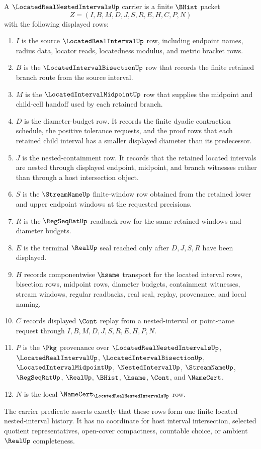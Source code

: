 \begin{definition}
\label{def:located-real-nested-intervals-carrier}
A $\LocatedRealNestedIntervalsUp$ carrier is a finite $\BHist$ packet
$$
Z=(I,B,M,D,J,S,R,E,H,C,P,N)
$$
with the following displayed rows:
\begin{enumerate}
\item $I$ is the source $\LocatedRealIntervalUp$ row, including endpoint names, radius data, locator reads, locatedness modulus, and metric bracket rows.
\item $B$ is the $\LocatedIntervalBisectionUp$ row that records the finite retained branch route from the source interval.
\item $M$ is the $\LocatedIntervalMidpointUp$ row that supplies the midpoint and child-cell handoff used by each retained branch.
\item $D$ is the diameter-budget row. It records the finite dyadic contraction schedule, the positive tolerance requests, and the proof rows that each retained child interval has a smaller displayed diameter than its predecessor.
\item $J$ is the nested-containment row. It records that the retained located intervals are nested through displayed endpoint, midpoint, and branch witnesses rather than through a host intersection object.
\item $S$ is the $\StreamNameUp$ finite-window row obtained from the retained lower and upper endpoint windows at the requested precisions.
\item $R$ is the $\RegSeqRatUp$ readback row for the same retained windows and diameter budgets.
\item $E$ is the terminal $\RealUp$ seal reached only after $D,J,S,R$ have been displayed.
\item $H$ records componentwise $\hsame$ transport for the located interval rows, bisection rows, midpoint rows, diameter budgets, containment witnesses, stream windows, regular readbacks, real seal, replay, provenance, and local naming.
\item $C$ records displayed $\Cont$ replay from a nested-interval or point-name request through $I,B,M,D,J,S,R,E,H,P,N$.
\item $P$ is the $\Pkg$ provenance over $\LocatedRealNestedIntervalsUp$, $\LocatedRealIntervalUp$, $\LocatedIntervalBisectionUp$, $\LocatedIntervalMidpointUp$, $\NestedIntervalUp$, $\StreamNameUp$, $\RegSeqRatUp$, $\RealUp$, $\BHist$, $\hsame$, $\Cont$, and $\NameCert$.
\item $N$ is the local $\NameCert_{\LocatedRealNestedIntervalsUp}$ row.
\end{enumerate}
The carrier predicate asserts exactly that these rows form one finite located nested-interval history. It has no coordinate for host interval intersection, selected quotient representatives, open-cover compactness, countable choice, or ambient $\RealUp$ completeness.
\end{definition}

